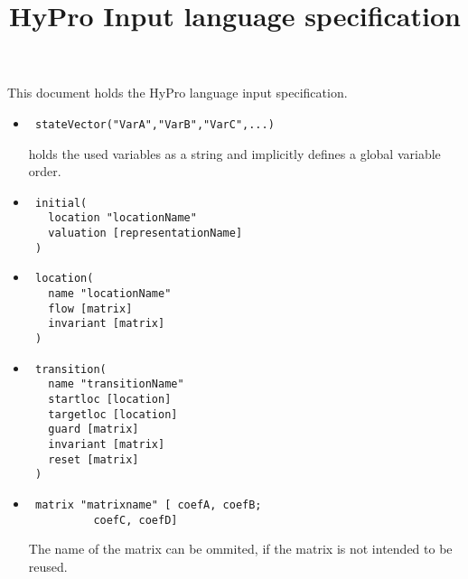 \documentclass{article}
\title{HyPro Input language specification}
\begin{document}
This document holds the HyPro language input specification.

\begin{itemize}
\item \begin{verbatim}
 stateVector("VarA","VarB","VarC",...)
        \end{verbatim}
holds the used variables as a string and implicitly defines a global variable order.

\item \begin{verbatim}
 initial(
   location "locationName"
   valuation [representationName]
 )
        \end{verbatim}
        
\item \begin{verbatim}
 location(
   name "locationName"
   flow [matrix]
   invariant [matrix]
 )
        \end{verbatim}
        
\item \begin{verbatim}
 transition(
   name "transitionName"
   startloc [location]
   targetloc [location]
   guard [matrix]
   invariant [matrix]
   reset [matrix]
 )
        \end{verbatim}

\item \begin{verbatim}
 matrix "matrixname" [ coefA, coefB;
          coefC, coefD]
        \end{verbatim}
The name of the matrix can be ommited, if the matrix is not intended to be reused.

\end{itemize}
\end{document}
